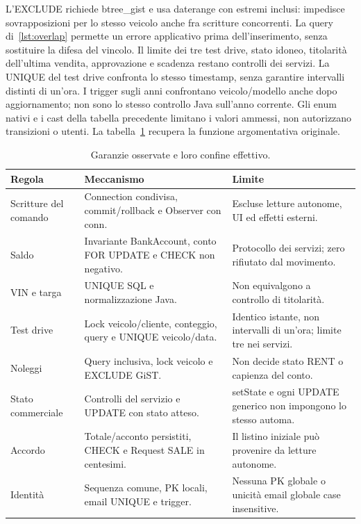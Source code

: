 L'EXCLUDE richiede btree\_gist e usa daterange con estremi inclusi:
impedisce sovrapposizioni per lo stesso veicolo anche fra scritture
concorrenti. La query di~\ref{lst:overlap} permette un errore applicativo
prima dell'inserimento, senza sostituire la difesa del vincolo.
Il limite dei tre test drive, stato idoneo, titolarità dell'ultima vendita,
approvazione e scadenza restano controlli dei servizi. La UNIQUE del test
drive confronta lo stesso timestamp, senza garantire intervalli distinti
di un'ora. I trigger sugli anni confrontano veicolo/modello anche dopo
aggiornamento; non sono lo stesso controllo Java sull'anno corrente.
Gli enum nativi e i cast della tabella precedente limitano i valori
ammessi, non autorizzano transizioni o utenti. La
tabella~\ref{tab:impl-garanzie} recupera la funzione argomentativa originale.

\begin{table}[htbp]
\centering\small
\caption{Garanzie osservate e loro confine effettivo.}\label{tab:impl-garanzie}
\begin{tabular}{>{\raggedright\arraybackslash}p{.23\linewidth}>{\raggedright\arraybackslash}p{.35\linewidth}>{\raggedright\arraybackslash}p{.32\linewidth}}
\textbf{Regola} & \textbf{Meccanismo} & \textbf{Limite}\\\hline
Scritture del comando & Connection condivisa, commit/rollback e Observer con conn. & Escluse letture autonome, UI ed effetti esterni.\\
Saldo & Invariante BankAccount, conto FOR UPDATE e CHECK non negativo. & Protocollo dei servizi; zero rifiutato dal movimento.\\
VIN e targa & UNIQUE SQL e normalizzazione Java. & Non equivalgono a controllo di titolarità.\\
Test drive & Lock veicolo/cliente, conteggio, query e UNIQUE veicolo/data. & Identico istante, non intervalli di un'ora; limite tre nei servizi.\\
Noleggi & Query inclusiva, lock veicolo e EXCLUDE GiST. & Non decide stato RENT o capienza del conto.\\
Stato commerciale & Controlli del servizio e UPDATE con stato atteso. & setState e ogni UPDATE generico non impongono lo stesso automa.\\
Accordo & Totale/acconto persistiti, CHECK e Request SALE in centesimi. & Il listino iniziale può provenire da letture autonome.\\
Identità & Sequenza comune, PK locali, email UNIQUE e trigger. & Nessuna PK globale o unicità email globale case insensitive.\\\hline
\end{tabular}
\end{table}

